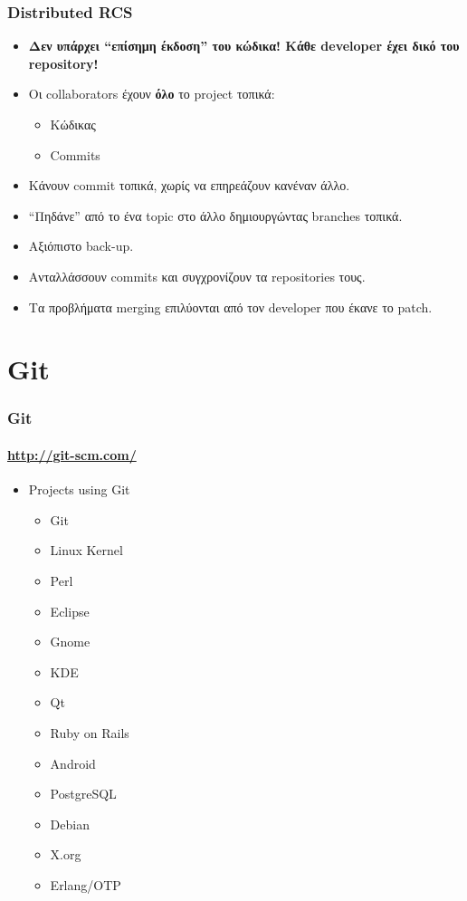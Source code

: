 \documentclass[]{beamer}
\begin{document}
\begin{frame}
  \frametitle{Distributed RCS}
  \begin{itemize}
    \item \textbf{Δεν υπάρχει ``επίσημη έκδοση'' του κώδικα! Κάθε developer έχει
      δικό του repository!}\pause
    \item Οι collaborators έχουν \textbf{όλο} το project τοπικά:
      \begin{itemize}
        \item Κώδικας
        \item Commits
      \end{itemize}\pause
    \item Κάνουν commit τοπικά, χωρίς να επηρεάζουν κανέναν άλλο.\pause
    \item ``Πηδάνε'' από το ένα topic στο άλλο δημιουργώντας branches
      τοπικά.\pause
    \item Αξιόπιστο back-up.\pause
    \item Ανταλλάσσουν commits και συγχρονίζουν τα repositories τους.\pause
    \item Τα προβλήματα merging επιλύονται από τον developer που έκανε το patch.
  \end{itemize}
\end{frame}

\section{Git}

\begin{frame}
  \frametitle{Git}
  \framesubtitle{\url{http://git-scm.com/}}
  \begin{itemize}
  \item Projects using Git
    \begin{itemize}
    \item Git
    \item Linux Kernel
    \item Perl
    \item Eclipse
    \item Gnome
    \item KDE
    \item Qt
    \item Ruby on Rails
    \item Android
    \item PostgreSQL
    \item Debian
    \item X.org
    \item Erlang/OTP
    \end{itemize}
  \end{itemize}
\end{frame}
\end{document}
